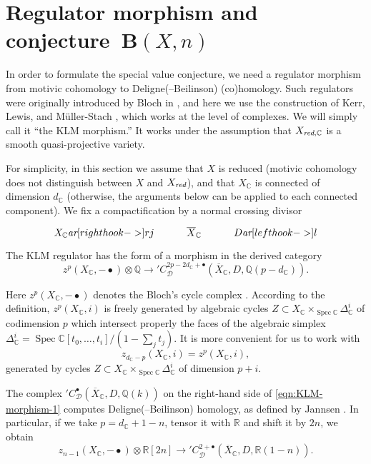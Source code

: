 \documentclass[10pt,a4paper,oneside,draft]{article}
\DeclareMathOperator{\Spec}{Spec}
\newcommand{\CC}{\mathbb{C}}
\newcommand{\QQ}{\mathbb{Q}}
\newcommand{\RR}{\mathbb{R}}
\newcommand{\ar}{\text{\it ar}}
\newcommand{\red}{\text{\it red}}
\theoremstyle{myplain}
\theoremstyle{mydefinition}
\numberwithin{equation}{section}
\begin{document}
\section{Regulator morphism and conjecture~$\mathbf{B} (X,n)$}
\label{sec:regulator}

In order to formulate the special value conjecture, we need a regulator morphism
from motivic cohomology to Deligne(--Beilinson) (co)homology. Such regulators
were originally introduced by Bloch in \cite{Bloch-1986-Lefschetz}, and here we
use the construction of Kerr, Lewis, and M\"{u}ller-Stach
\cite{Kerr-Lewis-Muller-Stach-2006}, which works at the level of complexes.
We will simply call it ``the KLM morphism.'' It works under the assumption that
$X_{\red,\CC}$ is a smooth quasi-projective variety.

For simplicity, in this section we assume that $X$ is reduced (motivic
cohomology does not distinguish between $X$ and $X_\red$), and that $X_\CC$ is
connected of dimension $d_\CC$ (otherwise, the arguments below can be applied to
each connected component). We fix a compactification by a normal crossing
divisor
\[ \begin{tikzcd}
    X_\CC \ar[right hook->]{r}{j} & \overline{X}_\CC & D \ar[left hook->]{l}
  \end{tikzcd} \]
The KLM regulator has the form of a morphism in the derived category
\begin{equation}
  \label{eqn:KLM-morphism-1}
  z^p (X_\CC, -\bullet) \otimes \QQ \to
  {}' C_\mathcal{D}^{2p - 2d_\CC + \bullet} (\overline{X}_\CC, D, \QQ (p-d_\CC)).
\end{equation}

Here $z^p (X_\CC, -\bullet)$ denotes the Bloch's cycle complex
\cite{Bloch-1986}. According to the definition, $z^p (X_\CC, i)$ is freely
generated by algebraic cycles $Z \subset X_\CC \times_{\Spec \CC} \Delta_\CC^i$
of codimension $p$ which intersect properly the faces of the algebraic simplex
$\Delta_\CC^i = \Spec \CC [t_0,\ldots,t_i]/(1 - \sum_j t_j)$. It is more
convenient for us to work with
$$z_{d_\CC - p} (X_\CC, i) = z^p (X_\CC, i),$$
generated by cycles $Z \subset X_\CC \times_{\Spec \CC} \Delta_\CC^i$ of
dimension $p+i$.

The complex ${}' C_\mathcal{D}^{\bullet} (\overline{X}_\CC, D, \QQ (k))$ on the
right-hand side of \eqref{eqn:KLM-morphism-1} computes Deligne(--Beilinson)
homology, as defined by Jannsen \cite{Jannsen-1988}. In particular, if we take
$p = d_\CC + 1 - n$, tensor it with $\RR$ and shift it by $2n$, we obtain
\begin{equation}
  \label{eqn:KLM-morphism-2}
  z_{n-1} (X_\CC, -\bullet) \otimes \RR [2n] \to
  {}' C_\mathcal{D}^{2 + \bullet} (\overline{X}_\CC, D, \RR (1-n)).
\end{equation}
\end{document}
